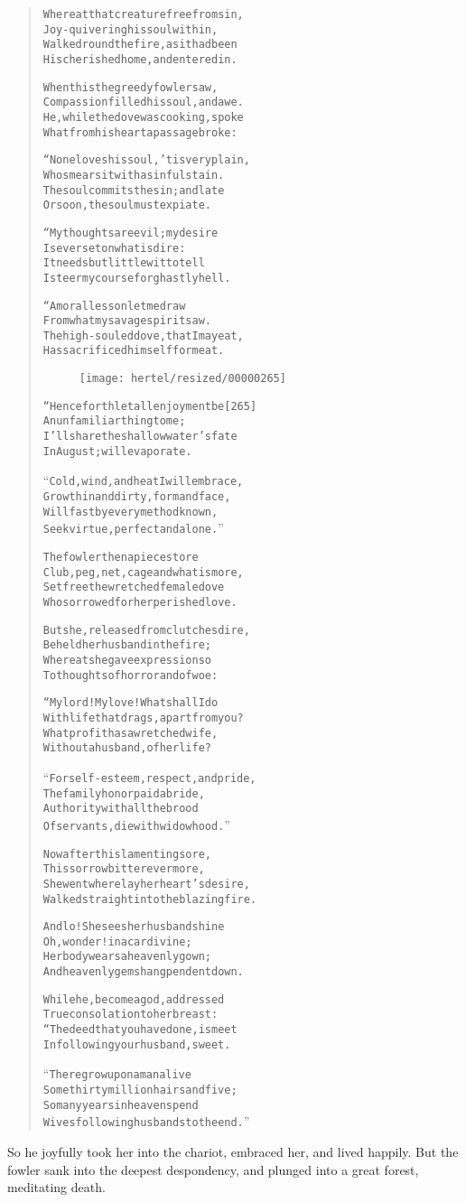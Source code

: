 \documentclass[article, twoside, 10pt]{memoir}
\renewenvironment{verbatim}{%
\begin{quote}%
\vskip -10pt%
\begin{alltt}\normalfont\small}{\end{alltt}%
\end{quote}%
\vskip -10pt
} %
\begin{document}
\begin{verbatim}
Whereat that creature free from sin,
Joy-quivering his soul within,
Walked round the fire, as it had been
His cherished home, and entered in.

When this the greedy fowler saw,
Compassion filled his soul, and awe.
He, while the dove was cooking, spoke
What from his heart a passage broke:

“None loves his soul, 'tis very plain,
Who smears it with a sinful stain.
The soul commits the sin; and late
Or soon, the soul must expiate.

“My thoughts are evil; my desire
Is ever set on what is dire:
It needs but little wit to tell
I steer my course for ghastly hell.

“A moral lesson let me draw
From what my savage spirit saw.
The high-souled dove, that I may eat,
Has sacrificed himself for meat.

\begin{figure}[p]\texttt{[image: hertel/resized/00000265]}\end{figure}“Henceforth let all enjoyment be                        [265]
An unfamiliar thing to me;
I'll share the shallow water's fate
In August; will evaporate.

“Cold, wind, and heat I will embrace,
Grow thin and dirty, form and face,
Will fast by every method known,
Seek virtue, perfect and alone.”

The fowler then apieces tore
Club, peg, net, cage{\textemdash}and what is more,
Set free the wretched female dove
Who sorrowed for her perished love.

But she, released from clutches dire,
Beheld her husband in the fire;
Whereat she gave expression so
To thoughts of horror and of woe:

“My lord! My love! What shall I do
With life that drags, apart from you?
What profit has a wretched wife,
Without a husband, of her life?

“For self-esteem, respect, and pride,
The family honor paid a bride,
Authority with all the brood
Of servants, die with widowhood.”

Now after this lamenting sore,
This sorrow bitter evermore,
She went where lay her heart's desire,
Walked straight into the blazing fire.

And lo! She sees her husband shine{\textemdash}
Oh, wonder!{\textemdash}in a car divine;
Her body wears a heavenly gown;
And heavenly gems hang pendent down.

While he, become a god, addressed
True consolation to her breast:
“The deed that you have done, is meet
In following your husband, sweet.

“There grow upon a man alive
Some thirty million hairs and five;
So many years in heaven spend
Wives following husbands to the end.”
\end{verbatim}
So he joyfully took her into the chariot, embraced her, and lived
happily. But the fowler sank into the deepest despondency, and
plunged into a great forest, meditating death.
\end{document}
